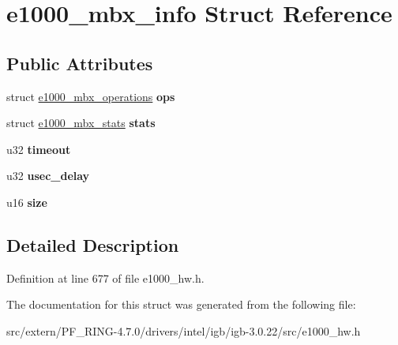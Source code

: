 \hypertarget{structe1000__mbx__info}{
\section{e1000\_\-mbx\_\-info Struct Reference}
\label{structe1000__mbx__info}
}
\subsection*{Public Attributes}
\begin{DoxyCompactItemize}
\item 
\hypertarget{structe1000__mbx__info_ae1234430087b30da96eb4ae82b5a90ea}{
struct \hyperlink{structe1000__mbx__operations}{e1000\_\-mbx\_\-operations} {\bfseries ops}}
\label{structe1000__mbx__info_ae1234430087b30da96eb4ae82b5a90ea}

\item 
\hypertarget{structe1000__mbx__info_a62a07c36161ad8985380f2886fadad50}{
struct \hyperlink{structe1000__mbx__stats}{e1000\_\-mbx\_\-stats} {\bfseries stats}}
\label{structe1000__mbx__info_a62a07c36161ad8985380f2886fadad50}

\item 
\hypertarget{structe1000__mbx__info_a35d6d422df7239cb1bb8f7c1ffc70721}{
u32 {\bfseries timeout}}
\label{structe1000__mbx__info_a35d6d422df7239cb1bb8f7c1ffc70721}

\item 
\hypertarget{structe1000__mbx__info_a590b736836fa8b2eb65d0715ddbba56d}{
u32 {\bfseries usec\_\-delay}}
\label{structe1000__mbx__info_a590b736836fa8b2eb65d0715ddbba56d}

\item 
\hypertarget{structe1000__mbx__info_a53192d48fb1c4d3cddd3877106ca6b0f}{
u16 {\bfseries size}}
\label{structe1000__mbx__info_a53192d48fb1c4d3cddd3877106ca6b0f}

\end{DoxyCompactItemize}


\subsection{Detailed Description}


Definition at line 677 of file e1000\_\-hw.h.



The documentation for this struct was generated from the following file:\begin{DoxyCompactItemize}
\item 
src/extern/PF\_\-RING-\/4.7.0/drivers/intel/igb/igb-\/3.0.22/src/e1000\_\-hw.h\end{DoxyCompactItemize}
